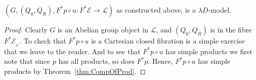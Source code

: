 \documentclass[a4paper,UKenglish]{lipics}
\newcommand{\E}{\mathcal{E}}
\newcommand{\fibre}[2]{#1_{_{#2}}}
\begin{document}
\begin{theorem}\label{thm:rel-model-generator}
$(G,(Q_0,Q_R), F^\ast p \circ u :F^{\ast} \E \rightarrow \mathcal{L})$ as constructed above, is a $\lambda D$-model.
\end{theorem}

\begin{proof}
Clearly $G$ is an Abelian group object in $\mathcal{L}$, and $(Q_0, Q_R)$ is in the fibre $\fibre{F^\ast \E}{G}$. To check that $F^\ast p \circ u$ is a Cartesian closed fibration is a simple exercise that we leave to the reader. And to see that $F^\ast p \circ u$ has simple products we first note that since $p$ has all products, so does $F^\ast p$. Hence, $F^\ast p \circ u$ has simple products by Theorem~\ref{thm:CompOfProd}.
\end{proof}
\end{document}
